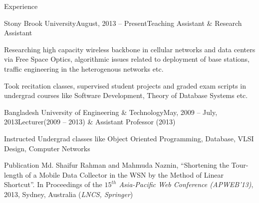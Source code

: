 \documentclass{resume} %
\begin{document}
\begin{rSection}{Experience}
\begin{rSubsection}{Stony Brook University}{August, 2013 -- 
Present}{Teaching Assistant \& Research Assistant}{}
\item Researching high capacity wireless backbone in cellular networks and data
centers via Free Space Optics, algorithmic issues related to deployment of base
stations, traffic engineering in the heterogenous networks etc.
\item Took recitation classes, supervised student projects and graded exam
scripts in undergrad courses like Software Development, Theory of Database
Systems etc.
\end{rSubsection} 
\begin{rSubsection}{Bangladesh University of Engineering \&
Technology}{May, 2009 -- July, 2013}{Lecturer(2009 -- 2013) \& Assistant
Professor (2013)}{}
\item Instructed Undergrad classes like Object Oriented Programming, Database,
 VLSI Design, Computer Networks 
\end{rSubsection}
\end{rSection}
\begin{rSection}{Publication}
 Md. Shaifur Rahman and Mahmuda Naznin, ``Shortening the Tour-length of a Mobile Data Collector
  in the WSN by the Method of Linear Shortcut''. In Proceedings of the
  \textit{$15^{th}$ Asia-Pacific Web Conference (APWEB'13)}, 2013, Sydney,
  Australia (\textit{LNCS, Springer})
\end{rSection}
\end{document}
